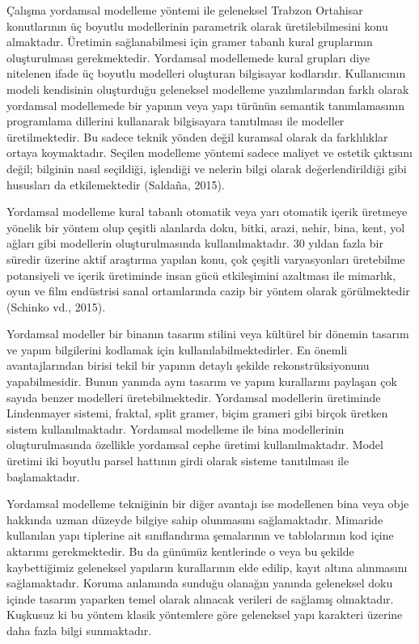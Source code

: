 \documentclass[12pt,turkish,a4paperpaper,]{report}
\begin{document}
Çalışma yordamsal modelleme yöntemi ile geleneksel Trabzon Ortahisar
konutlarının üç boyutlu modellerinin parametrik olarak üretilebilmesini
konu almaktadır. Üretimin sağlanabilmesi için gramer tabanlı kural
gruplarının oluşturulması gerekmektedir. Yordamsal modellemede kural
grupları diye nitelenen ifade üç boyutlu modelleri oluşturan bilgisayar
kodlarıdır. Kullanıcının modeli kendisinin oluşturduğu geleneksel
modelleme yazılımlarından farklı olarak yordamsal modellemede bir
yapının veya yapı türünün semantik tanımlamasının programlama dillerini
kullanarak bilgisayara tanıtılması ile modeller üretilmektedir. Bu
sadece teknik yönden değil kuramsal olarak da farklılıklar ortaya
koymaktadır. Seçilen modelleme yöntemi sadece maliyet ve estetik
çıktısını değil; bilginin nasıl seçildiği, işlendiği ve nelerin bilgi
olarak değerlendirildiği gibi hususları da etkilemektedir (Saldaña,
2015).

Yordamsal modelleme kural tabanlı otomatik veya yarı otomatik içerik
üretmeye yönelik bir yöntem olup çeşitli alanlarda doku, bitki, arazi,
nehir, bina, kent, yol ağları gibi modellerin oluşturulmasında
kullanılmaktadır. 30 yıldan fazla bir süredir üzerine aktif araştırma
yapılan konu, çok çeşitli varyasyonları üretebilme potansiyeli ve içerik
üretiminde insan gücü etkileşimini azaltması ile mimarlık, oyun ve film
endüstrisi sanal ortamlarında cazip bir yöntem olarak görülmektedir
(Schinko vd., 2015).

Yordamsal modeller bir binanın tasarım stilini veya kültürel bir dönemin
tasarım ve yapım bilgilerini kodlamak için kullanılabilmektedirler. En
önemli avantajlarından birisi tekil bir yapının detaylı şekilde
rekonstrüksiyonunu yapabilmesidir. Bunun yanında aynı tasarım ve yapım
kurallarını paylaşan çok sayıda benzer modelleri üretebilmektedir.
Yordamsal modellerin üretiminde Lindenmayer sistemi, fraktal, split
gramer, biçim grameri gibi birçok üretken sistem kullanılmaktadır.
Yordamsal modelleme ile bina modellerinin oluşturulmasında özellikle
yordamsal cephe üretimi kullanılmaktadır. Model üretimi iki boyutlu
parsel hattının girdi olarak sisteme tanıtılması ile başlamaktadır.

Yordamsal modelleme tekniğinin bir diğer avantajı ise modellenen bina
veya obje hakkında uzman düzeyde bilgiye sahip olunmasını sağlamaktadır.
Mimaride kullanılan yapı tiplerine ait sınıflandırma şemalarının ve
tablolarının kod içine aktarımı gerekmektedir. Bu da günümüz kentlerinde
o veya bu şekilde kaybettiğimiz geleneksel yapıların kurallarının elde
edilip, kayıt altına alınmasını sağlamaktadır. Koruma anlamında sunduğu
olanağın yanında geleneksel doku içinde tasarım yaparken temel olarak
alınacak verileri de sağlamış olmaktadır. Kuşkusuz ki bu yöntem klasik
yöntemlere göre geleneksel yapı karakteri üzerine daha fazla bilgi
sunmaktadır.
\end{document}
